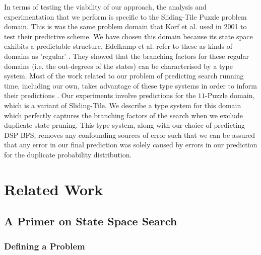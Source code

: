 \documentclass{article}
\begin{document}
In terms of testing the viability of our approach,
the analysis and experimentation that we perform is specific to the Sliding-Tile Puzzle problem domain.
This is was the same problem domain that Korf et al. used in 2001 \cite{korf2001time} to test
their predictive scheme.
We have chosen this domain because its state space exhibits a predictable structure.
Edelkamp et al. refer to these as kinds of domains as 'regular' \cite{edelkamp1998branching}.
They showed that the branching factors for these regular domains (i.e. the out-degrees of the states)
can be characterised by a type system. Most of the work related to our problem of predicting search running time,
including our own,
takes advantage of these type systems in order to inform their predictions \cite{chen1992heuristic, korf2001time, zahavi2010predicting, lelis2013predicting, lelis2014estimating}.
Our experiments involve predictions for the \(11\)-Puzzle domain, which is a variant of Sliding-Tile.
We describe a type system for this domain which perfectly captures the branching factors
of the search when we exclude duplicate state pruning.
This type system, along with our choice of predicting DSP BFS,
removes any confounding sources of error
such that we can be assured that any error in our final prediction was solely caused by errors in our prediction for the duplicate probability distribution. \\

\section{Related Work}

\subsection{A Primer on State Space Search}

\subsubsection*{Defining a Problem}
\end{document}
